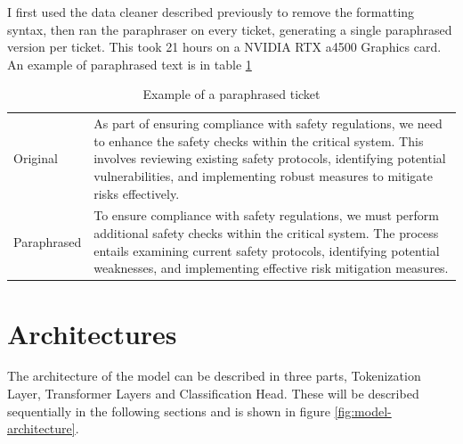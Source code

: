 \documentclass{UoYCSproject}
\begin{document}
    I first used the data cleaner described previously to remove the formatting syntax, then ran the paraphraser on every ticket, generating a single paraphrased version per ticket.
    This took 21 hours on a NVIDIA RTX a4500 Graphics card. An example of paraphrased text is in table \ref{tab:paraphrased} \par
    \begin{table}
    \centering
    \begin{tabular}{p{2.5cm}p{9cm}}
    \toprule
    Original    & As part of ensuring compliance with safety regulations, we need to enhance the safety checks within the critical system. This involves reviewing existing safety protocols, identifying potential vulnerabilities, and implementing robust measures to mitigate risks effectively. \\\addlinespace[0.5em]
    Paraphrased & To ensure compliance with safety regulations, we must perform additional safety checks within the critical system. The process entails examining current safety protocols, identifying potential weaknesses, and implementing effective risk mitigation measures.

      \\
    \bottomrule
    \end{tabular}

    \caption{Example of a paraphrased ticket}
    \label{tab:paraphrased}
    \end{table}


    \section{Architectures}\label{sec:architectures}
    The architecture of the model can be described in three parts, Tokenization Layer, Transformer Layers and Classification Head.
    These will be described sequentially in the following sections and is shown in figure \ref{fig:model-architecture}.\par
\end{document}
